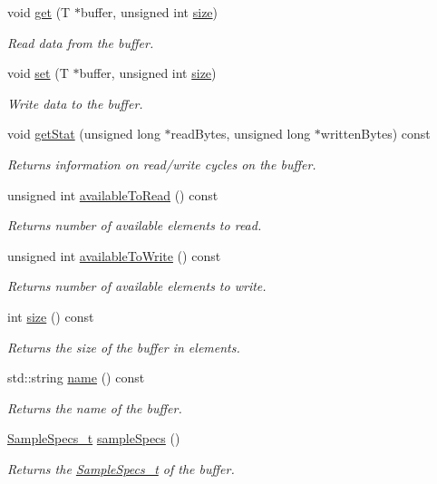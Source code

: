 \begin{DoxyCompactItemize}
\item 
void \hyperlink{group__Audio_ga3923df13e2115ece2a5f4969a9b2f890}{get} (T $\ast$buffer, unsigned int \hyperlink{group__Audio_ga8e5076598374af82eb754cea0c88d12d}{size})
\begin{DoxyCompactList}\small\item\em Read data from the buffer. \end{DoxyCompactList}\item 
void \hyperlink{group__Audio_gab60ad480d2ebe4b2aa526d31d808be7a}{set} (T $\ast$buffer, unsigned int \hyperlink{group__Audio_ga8e5076598374af82eb754cea0c88d12d}{size})
\begin{DoxyCompactList}\small\item\em Write data to the buffer. \end{DoxyCompactList}\item 
void \hyperlink{group__Audio_ga012421a899e2da4cf994556ccfcb1880}{get\+Stat} (unsigned long $\ast$read\+Bytes, unsigned long $\ast$written\+Bytes) const 
\begin{DoxyCompactList}\small\item\em Returns information on read/write cycles on the buffer. \end{DoxyCompactList}\item 
unsigned int \hyperlink{group__Audio_ga75e3bbb71d5eeb19224f1503d58e1b0a}{available\+To\+Read} () const 
\begin{DoxyCompactList}\small\item\em Returns number of available elements to read. \end{DoxyCompactList}\item 
unsigned int \hyperlink{group__Audio_ga440f66059781b20486d6d6c160e4f0ed}{available\+To\+Write} () const 
\begin{DoxyCompactList}\small\item\em Returns number of available elements to write. \end{DoxyCompactList}\item 
int \hyperlink{group__Audio_ga8e5076598374af82eb754cea0c88d12d}{size} () const 
\begin{DoxyCompactList}\small\item\em Returns the size of the buffer in elements. \end{DoxyCompactList}\item 
std\+::string \hyperlink{group__Audio_gad287c03d36b07643b960d531b5553109}{name} () const 
\begin{DoxyCompactList}\small\item\em Returns the name of the buffer. \end{DoxyCompactList}\item 
\hyperlink{structNl_1_1SampleSpecs__t}{Sample\+Specs\+\_\+t} \hyperlink{group__Audio_gaa20cb3b07f5820cd2a3d70f724460659}{sample\+Specs} ()
\begin{DoxyCompactList}\small\item\em Returns the \hyperlink{structNl_1_1SampleSpecs__t}{Sample\+Specs\+\_\+t} of the buffer. \end{DoxyCompactList}\end{DoxyCompactItemize}


